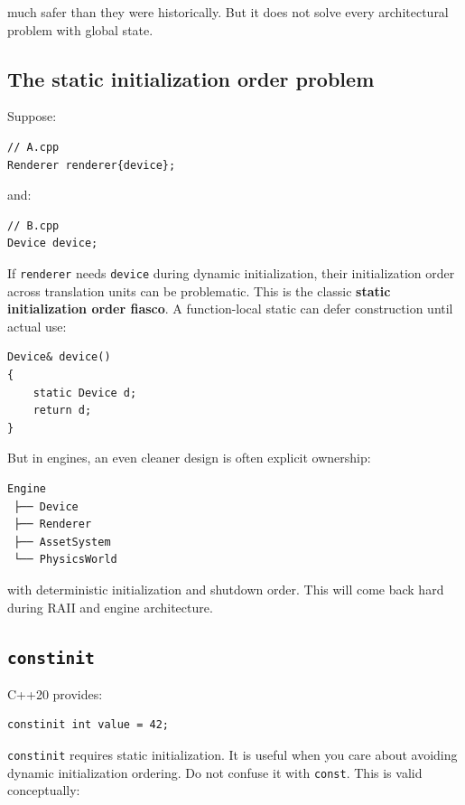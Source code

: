 much safer than they were historically. But it does not solve every architectural problem with global state.

\subsection{The static initialization order problem}\label{05-engine-i-ch002-the-static-initialization-order-problem}

Suppose:

\begin{verbatim}
// A.cpp
Renderer renderer{device};
\end{verbatim}

and:

\begin{verbatim}
// B.cpp
Device device;
\end{verbatim}

If \texttt{renderer} needs \texttt{device} during dynamic initialization, their initialization order across translation units can be problematic. This is the classic \textbf{static initialization order fiasco}. A function-local static can defer construction until actual use:

\begin{verbatim}
Device& device()
{
    static Device d;
    return d;
}
\end{verbatim}

But in engines, an even cleaner design is often explicit ownership:

\begin{verbatim}
Engine
 ├── Device
 ├── Renderer
 ├── AssetSystem
 └── PhysicsWorld
\end{verbatim}

with deterministic initialization and shutdown order. This will come back hard during RAII and engine architecture.

\subsection{\texorpdfstring{\texttt{constinit}}{constinit}}\label{05-engine-i-ch002-constinit}

C++20 provides:

\begin{verbatim}
constinit int value = 42;
\end{verbatim}

\texttt{constinit} requires static initialization. It is useful when you care about avoiding dynamic initialization ordering. Do not confuse it with \texttt{const}. This is valid conceptually:

